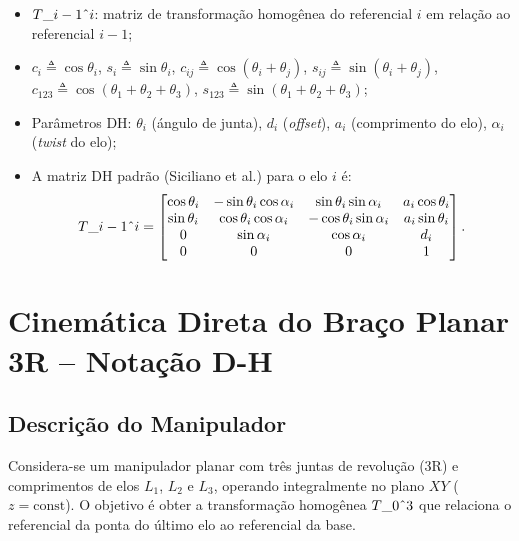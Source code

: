 \documentclass[12pt,a4paper]{article}
\def\Trans#1#2{T\string_#1\string^#2}%
\newcommand{\Trans}[2]{{}^{#1}_{#2}\!\mathbf{T}}
\begin{document}
\begin{itemize}[leftmargin=2cm]
  \item $\Trans{i-1}{i}$: matriz de transforma\c{c}\~ao homog\^enea do referencial $i$ em rela\c{c}\~ao ao referencial $i-1$;
  \item $c_i \triangleq \cos\theta_i$,\; $s_i \triangleq \sin\theta_i$,\;
        $c_{ij} \triangleq \cos(\theta_i+\theta_j)$,\; $s_{ij} \triangleq \sin(\theta_i+\theta_j)$,\;
        $c_{123} \triangleq \cos(\theta_1+\theta_2+\theta_3)$,\; $s_{123} \triangleq \sin(\theta_1+\theta_2+\theta_3)$;
  \item Par\^ametros DH: $\theta_i$ (\'angulo de junta), $d_i$ (\textit{offset}), $a_i$ (comprimento do elo), $\alpha_i$ (\textit{twist} do elo);
  \item A matriz DH padr\~ao (Siciliano et al.) para o elo $i$ \'e:
  \[
    \Trans{i-1}{i} =
    \begin{bmatrix}
      \cos\theta_i & -\sin\theta_i\cos\alpha_i &  \sin\theta_i\sin\alpha_i & a_i\cos\theta_i \\
      \sin\theta_i &  \cos\theta_i\cos\alpha_i & -\cos\theta_i\sin\alpha_i & a_i\sin\theta_i \\
      0            &  \sin\alpha_i              &  \cos\alpha_i             & d_i             \\
      0            &  0                         &  0                        & 1
    \end{bmatrix}.
  \]
\end{itemize}

\newpage

\setcounter{section}{0}
\section{Cinem\'atica Direta do Bra\c{c}o Planar 3R -- Nota\c{c}\~ao D-H}

\subsection{Descri\c{c}\~ao do Manipulador}

Considera-se um manipulador planar com tr\^es juntas de revolu\c{c}\~ao (3R) e
comprimentos de elos $L_1$, $L_2$ e $L_3$, operando integralmente no plano $XY$
($z = \text{const}$).
O objetivo \'e obter a transforma\c{c}\~ao homog\^enea $\Trans{0}{3}$ que relaciona
o referencial da ponta do \'ultimo elo ao referencial da base.
\end{document}
